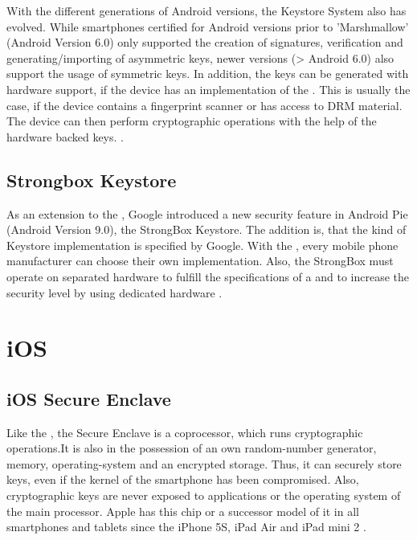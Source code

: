 \documentclass[12pt,oneside,a4paper,parskip]{scrbook}
\begin{document}
With the different generations of Android versions, the Keystore System also has evolved. While smartphones certified for Android versions prior to 'Marshmallow' (Android Version 6.0) only supported the creation of signatures, verification and generating/importing of asymmetric keys, newer versions (> Android 6.0) also support the usage of symmetric keys. In addition, the keys can be generated with hardware support, if the device has an implementation of the . This is usually the case, if the device contains a fingerprint scanner or has access to DRM material. The device can then perform cryptographic operations with the help of the hardware backed keys. \parencite{google_hardware-backed_2020}.

\newpage
\subsection{Strongbox Keystore}
\label{subsec:strongbox}
As an extension to the , Google introduced a new security feature in Android Pie (Android Version 9.0), the StrongBox Keystore. The addition is, that the kind of Keystore implementation is specified by Google. With the , every mobile phone manufacturer can choose their own implementation. Also, the StrongBox must operate on separated hardware to fulfill the specifications of a  and to increase the security level by using dedicated hardware \parencite{google_android_2020}.


\section{iOS}

\subsection{iOS Secure Enclave}
\label{subsec:sec_enclave}

Like the , the Secure Enclave is a coprocessor, which runs cryptographic operations.It is also in the possession of an own random-number generator, memory, operating-system and an encrypted storage. Thus, it can securely store keys, even if the kernel of the smartphone has been compromised. Also, cryptographic keys are never exposed to applications or the operating system of the main processor. Apple has this chip or a successor model of it in all smartphones and tablets since the iPhone 5S, iPad Air and iPad mini 2 \parencite{apple_storing_2020}.
\end{document}
